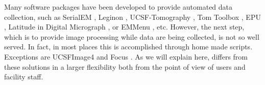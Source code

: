 Many software packages have been developed to provide automated data collection, such as SerialEM \citep{Mastronarde2005}, Leginon \citep{Suloway2009}, UCSF-Tomography \citep{Zheng2007}, Tom Toolbox \citep{Nickell2005}, EPU \citep{EPU}, Latitude in Digital Micrograph \citep{Latitude}, or EMMenu \citep{emmenu}, etc. However, the next step,  which is to provide image processing while  data are being collected, is not so well served. In fact, in most places this is accomplished through home made scripts. Exceptions are UCSFImage4 \citep{Li2015} and Focus \citep{Biyani2017}. As we will explain here, \scipion differs from these solutions in a larger flexibility both from the point of view of users and facility staff.
